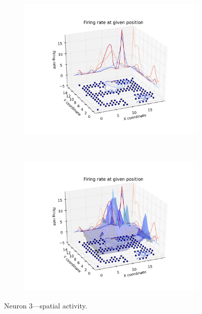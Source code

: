 \documentclass[11pt,a4paper,twocolumn]{article}
\begin{document}
\begin{figure}[htbp]
  \begin{subfigure}{.99\linewidth}\centering
    \includegraphics[width=1.1\textwidth]{figure8_a.png}
    \caption{\label{fig:3d_n3_a}}
  \end{subfigure}\\[1ex]
  \begin{subfigure}{.99\linewidth}\centering
    \includegraphics[width=1.1\textwidth]{figure8_b.png}
    \caption{\label{fig:3d_n3_b}}
  \end{subfigure}

  \caption{Neuron 3---spatial activity.\label{fig:3d_n3}}
\end{figure}
\end{document}
